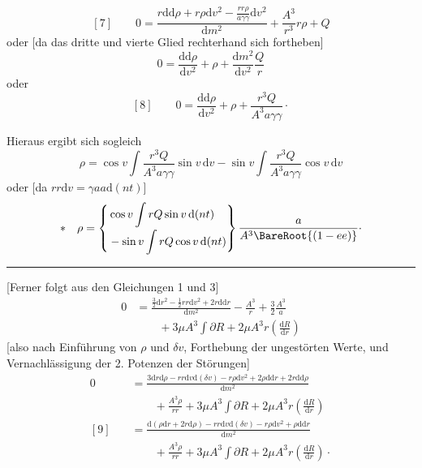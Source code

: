\[
[7]\qquad 0=\frac{r\mathrm{d}\mathrm{d}\rho+r\rho\mathrm{d}v^{2}-\frac{rr\rho}{a\gamma\gamma}\mathrm{d}v^{2}}{\mathrm{d}m^{2}}+\frac{A^{3}}{r^{3}}r\rho+Q
\]
oder [da das dritte und vierte Glied rechterhand sich fortheben]
\[
0=\frac{\mathrm{d}\mathrm{d}\rho}{\mathrm{d}v^{2}}+\rho+\frac{\mathrm{d}m^{2}}{\mathrm{d}v^{2}}\frac{Q}{r}
\]
oder
\[
[8]\qquad 0=\frac{\mathrm{d}\mathrm{d}\rho}{\mathrm{d}v^{2}}+\rho+\frac{r^{3}Q}{A^{3}a\gamma\gamma}\mathpunct{\cdot}
\]
\par
\noindent\hspace*{\parindent}Hieraus ergibt sich sogleich
\[
\rho=\cos v\int\frac{r^{3}Q}{A^{3}a\gamma\gamma}\sin v\,\mathrm{d}v-\sin v\int\frac{r^{3}Q}{A^{3}a\gamma\gamma}\cos v\,\mathrm{d}v
\]
oder [da \(rr\mathrm{d}v=\gamma aa\mathrm{d}(nt)\)]
\[
*\quad\rho=\left\{\begin{aligned}&\cos v\int rQ\sin v\,\mathrm{d}(nt)\\[-2pt]&-\sin v\int rQ\cos v\,\mathrm{d}(nt)\end{aligned}\right\}\frac{a}{A^{3}\BareRoot{(1-ee)}}\mathpunct{\cdot}
\]
\par\medskip
\begin{center}\rule{.27\linewidth}{.4pt}\end{center}
\par
\noindent\hspace*{\parindent}[Ferner folgt aus den Gleichungen 1 und 3]
\[
\begin{aligned}
0&=\frac{\frac32\mathrm{d}r^{2}-\frac12rr\mathrm{d}v^{2}+2r\mathrm{d}\mathrm{d}r}{\mathrm{d}m^{2}}-\frac{A^{3}}{r}+\frac32\frac{A^{3}}{a}\\
&\qquad+3\mu A^{3}\int\partial R+2\mu A^{3}r\left(\frac{\mathrm{d}R}{\mathrm{d}r}\right)
\end{aligned}
\]
[also nach Einführung von \(\rho\) und \(\delta v\), Forthebung der ungestörten Werte, und Vernachlässigung der 2. Potenzen der Störungen]
\[
\begin{aligned}
0&=\frac{3\mathrm{d}r\mathrm{d}\rho-rr\mathrm{d}v\mathrm{d}(\delta v)-r\rho\mathrm{d}v^{2}+2\rho\mathrm{d}\mathrm{d}r+2r\mathrm{d}\mathrm{d}\rho}{\mathrm{d}m^{2}}\\
&\qquad+\frac{A^{3}\rho}{rr}+3\mu A^{3}\int\partial R+2\mu A^{3}r\left(\frac{\mathrm{d}R}{\mathrm{d}r}\right)\\[6pt]
[9]\quad&=\frac{\mathrm{d}(\rho\mathrm{d}r+2r\mathrm{d}\rho)-rr\mathrm{d}v\mathrm{d}(\delta v)-r\rho\mathrm{d}v^{2}+\rho\mathrm{d}\mathrm{d}r}{\mathrm{d}m^{2}}\\
&\qquad+\frac{A^{3}\rho}{rr}+3\mu A^{3}\int\partial R+2\mu A^{3}r\left(\frac{\mathrm{d}R}{\mathrm{d}r}\right)\mathpunct{\cdot}
\end{aligned}
\]
